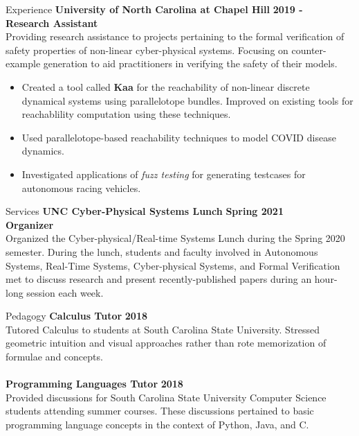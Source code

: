 \documentclass{resume} %
\begin{document}
\begin{rSection}{Experience}
{\bf University of North Carolina at Chapel Hill} \hfill {\bf 2019 -} \\
{\bf Research Assistant} \\
Providing research assistance to projects pertaining to the formal verification of safety properties of non-linear cyber-physical systems. Focusing on counter-example generation to aid practitioners in verifying the safety of their models.
\begin{itemize}
\item Created a tool called {\bf Kaa} for the reachability of non-linear discrete dynamical systems using parallelotope bundles. Improved on existing tools for reachablility computation using these techniques.
\item Used parallelotope-based reachability techniques to model COVID disease dynamics.
\item Investigated applications of \emph{fuzz testing} for generating testcases for autonomous racing vehicles.
\end{itemize}

\end{rSection}

\newpage

\begin{rSection}{Services}
  {\bf UNC Cyber-Physical Systems Lunch } \hfill {\bf Spring 2021}\\
  {\bf Organizer} \\
  Organized the Cyber-physical/Real-time Systems Lunch during the Spring 2020 semester. During the lunch, students and faculty involved in Autonomous Systems, Real-Time Systems, Cyber-physical Systems, and Formal Verification met to discuss research and present recently-published papers during an hour-long session each week.
\end{rSection}

\begin{rSection}{Pedagogy}
{\bf Calculus Tutor} \hfill {\bf 2018} \\
Tutored Calculus to students at South Carolina State University. Stressed geometric intuition and visual approaches rather than rote memorization of formulae and concepts. \\
\\
{\bf Programming Languages Tutor} \hfill {\bf 2018} \\
Provided discussions for South Carolina State University Computer Science students attending summer courses. These discussions pertained to basic programming language concepts in the context of Python, Java, and C. \\
\end{rSection}
\end{document}
